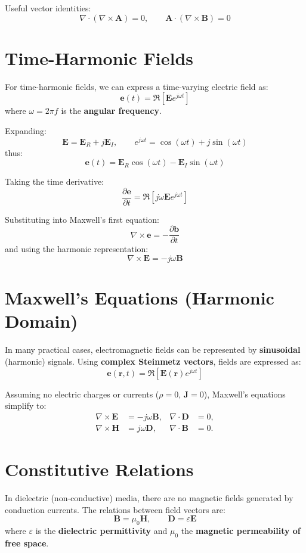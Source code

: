 Useful vector identities:
\[
\nabla \cdot (\nabla \times \mathbf{A}) = 0,
\qquad
\mathbf{A} \cdot (\nabla \times \mathbf{B}) = 0
\]


\section*{Time-Harmonic Fields}

For time-harmonic fields, we can express a time-varying electric field as:
\[
\mathbf{e}(t) = \Re \left[ \mathbf{E} e^{j\omega t} \right]
\]
where $\omega = 2\pi f$ is the \textbf{angular frequency}.

Expanding:
\[
\mathbf{E} = \mathbf{E}_R + j\mathbf{E}_I, \qquad
e^{j\omega t} = \cos(\omega t) + j\sin(\omega t)
\]
thus:
\[
\mathbf{e}(t) = \mathbf{E}_R \cos(\omega t) - \mathbf{E}_I \sin(\omega t)
\]

Taking the time derivative:
\[
\frac{\partial \mathbf{e}}{\partial t} = 
\Re \left[ j\omega \mathbf{E} e^{j\omega t} \right]
\]

Substituting into Maxwell’s first equation:
\[
\nabla \times \mathbf{e} = -\frac{\partial \mathbf{b}}{\partial t}
\]
and using the harmonic representation:
\[
\nabla \times \mathbf{E} = -j\omega \mathbf{B}
\]

\section*{Maxwell’s Equations (Harmonic Domain)}

In many practical cases, electromagnetic fields can be represented by \textbf{sinusoidal} (harmonic) signals.  
Using \textbf{complex Steinmetz vectors}, fields are expressed as:
\[
\mathbf{e}(\mathbf{r}, t) = \Re [ \mathbf{E}(\mathbf{r}) e^{j\omega t} ]
\]

Assuming no electric charges or currents ($\rho = 0$, $\mathbf{J} = 0$), Maxwell’s equations simplify to:
\begin{align}
\nabla \times \mathbf{E} &= -j\omega \mathbf{B}, &
\nabla \cdot \mathbf{D} &= 0, \\
\nabla \times \mathbf{H} &= j\omega \mathbf{D}, &
\nabla \cdot \mathbf{B} &= 0.
\end{align}

\section*{Constitutive Relations}

In dielectric (non-conductive) media, there are no magnetic fields generated by conduction currents.  
The relations between field vectors are:
\[
\mathbf{B} = \mu_0 \mathbf{H}, \qquad
\mathbf{D} = \varepsilon \mathbf{E}
\]
where $\varepsilon$ is the \textbf{dielectric permittivity} and $\mu_0$ the \textbf{magnetic permeability of free space}.

